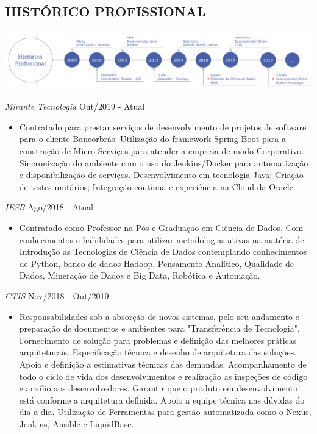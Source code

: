 \documentclass{res}
\begin{document}
\begin{resume}
		\section{HISTÓRICO PROFISSIONAL} %
		\vspace{8pt}
		\includegraphics[width=1.0\textwidth]{imagens/experiencia.png}
		
		{\sl Mirante Tecnologia} \hfill Out/2019 - Atual
		\begin{itemize}
			\item Contratado para prestar serviços de desenvolvimento de projetos de software para o cliente Bancorbrás. Utilização do framework Spring Boot para a construção de Micro Serviços para atender a empresa de modo Corporativo. Sincronização do ambiente com o uso do Jenkins/Docker para automatização e disponibilização de serviços. Desenvolvimento em tecnologia Java; Criação de testes unitários; Integração contínua e experiência na Cloud da Oracle. 
		\end{itemize}
		
		{\sl IESB} \hfill Ago/2018 - Atual
		\begin{itemize}
			\item Contratado como Professor na Pós e Graduação em Ciência de Dados. Com conhecimentos e habilidades para utilizar metodologias ativas na matéria de Introdução as Tecnologias de Ciência de Dados contemplando conhecimentos de Python, banco de dados Hadoop, Pensamento Analítico, Qualidade de Dados, Mineração de Dados e Big Data, Robótica e Automação.
		\end{itemize}
		
		{\sl CTIS} \hfill Nov/2018 - Out/2019
		\begin{itemize}
			\item Responsabilidades sob a absorção de novos sistemas, pelo seu andamento e preparação de documentos e ambientes para "Transferência de Tecnologia". Fornecimento de solução para problemas e definição das melhores práticas arquiteturais. Especificação técnica e desenho de arquitetura das soluções. Apoio e definição a estimativas técnicas das demandas. Acompanhamento de todo o ciclo de vida dos desenvolvimentos e realização as inspeções de código e auxílio aos desenvolvedores. Garantir que o produto em desenvolvimento está conforme a arquitetura definida. Apoio a equipe técnica nas dúvidas do dia-a-dia. Utilização de Ferramentas para gestão automatizada como o Nexus, Jenkins, Ansible e LiquidBase.
		\end{itemize}
		

\end{resume}
\end{document}
